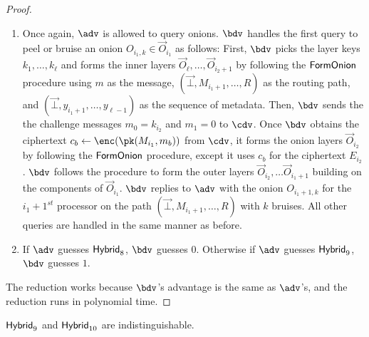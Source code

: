 \documentclass[runningheads,a4paper]{llncs}
\begin{document}
\begin{proof}
\begin{enumerate}
\item Once again, $\adv$ is allowed to query onions. $\bdv$ handles the first query to peel or bruise an onion $O_{i_1, k} \in \vec{O}_{i_1}$ as follows:  
First, $\bdv$ picks the layer keys $k_1, \dots, k_\ell$ and forms the inner layers $\vec{O}_\ell, \dots, \vec{O}_{i_2+1}$ by following the $\mathsf{FormOnion}$ procedure using $m$ as the message, $(\vec{\bot}, M_{i_1+1}, \dots, R)$ as the routing path, and $(\vec{\bot}, y_{i_1+1}, \dots, y_{\ell-1})$ as the sequence of metadata. 
Then, $\bdv$ sends the the challenge messages $m_0 = k_{i_2}$ and $m_1 = 0$ to $\cdv$. 
Once $\bdv$ obtains the ciphertext $c_b \gets \enc(\pk(M_{i_1}, m_b))$ from $\cdv$, it forms the onion layers $\vec{O}_{i_2}$ by following the $\mathsf{FormOnion}$ procedure, except it uses $c_b$ for the ciphertext $E_{i_2}$. 
$\bdv$ follows the procedure to form the outer layers $\vec{O}_{i_2}, \dots \vec{O}_{i_1+1}$ building on the components of $\vec{O}_{i_1}$. 
$\bdv$ replies to $\adv$ with the onion $O_{i_1+1, k}$ for the $i_1+1^\mathit{st}$ processor on the path $(\vec{\bot}, M_{i_1+1}, \dots, R)$ with $k$ bruises. 
All other queries are handled in the same manner as before. 

\item If $\adv$ guesses $\mathsf{Hybrid}_{8}$, $\bdv$ guesses $0$. Otherwise if $\adv$ guesses $\mathsf{Hybrid}_{9}$, $\bdv$ guesses $1$. 
\end{enumerate}
The reduction works because $\bdv$'s advantage is the same as $\adv$'s, and the reduction runs in polynomial time. 
\end{proof}


\begin{lemma}
$\mathsf{Hybrid}_{9}$ and $\mathsf{Hybrid}_{10}$ are indistinguishable. 
\end{lemma}
\end{document}
